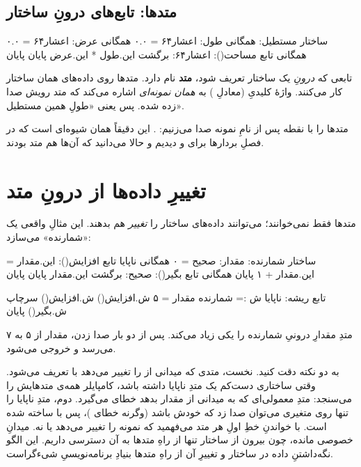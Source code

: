 \subsection{متدها: تابع‌های درونِ ساختار}

\begin{salamfa}
ساختار مستطیل:
    همگانی طول: اعشار۶۴ = ۰.۰
    همگانی عرض: اعشار۶۴ = ۰.۰
    همگانی تابع مساحت(): اعشار۶۴:
        برگشت این.طول * این.عرض
    پایان
پایان
\end{salamfa}

تابعی که \emph{درونِ} یک ساختار تعریف شود، \textbf{متد} نام دارد. متدها روی
داده‌های همان ساختار کار می‌کنند. واژهٔ کلیدیِ  (معادلِ )
به \emph{همان نمونه‌ای} اشاره می‌کند که متد رویش صدا زده شده. پس
 یعنی «طولِ همین مستطیل».

متدها را با نقطه پس از نامِ نمونه صدا می‌زنیم: . این دقیقاً
همان شیوه‌ای است که در فصلِ بردارها برای  و 
دیدیم و حالا می‌دانید که آن‌ها هم متد بودند.

\section{تغییرِ داده‌ها از درونِ متد}

متدها فقط نمی‌خوانند؛ می‌توانند داده‌های ساختار را \emph{تغییر} هم بدهند. این
مثالِ واقعی یک «شمارنده» می‌سازد:

\begin{salamfa}
ساختار شمارنده:
    مقدار: صحیح = ۰
    همگانی ناپایا تابع افزایش():
        این.مقدار = این.مقدار + ۱
    پایان
    همگانی تابع بگیر(): صحیح:
        برگشت این.مقدار
    پایان
پایان

تابع ریشه:
    ناپایا ش := شمارنده { مقدار = ۵ }
    ش.افزایش()
    ش.افزایش()
    سرچاپ ش.بگیر()
پایان
\end{salamfa}

متدِ  مقدارِ درونیِ شمارنده را یکی زیاد می‌کند. پس از دو بار صدا
زدن، مقدار از ۵ به ۷ می‌رسد و خروجی  می‌شود.

به دو نکته دقت کنید. نخست، متدی که میدانی از  را تغییر می‌دهد با
 تعریف می‌شود. وقتی ساختاری دست‌کم یک متدِ ناپایا داشته باشد،
کامپایلر همه‌ی متدهایش را می‌سنجد: متدِ معمولی‌ای که به میدانی از  مقدار
بدهد خطای  می‌گیرد. دوم، متدِ ناپایا را تنها روی متغیری می‌توان صدا
زد که خودش  باشد (وگرنه خطای )، پس  با
 ساخته شده است.
با خواندنِ خطِ اولِ هر متد می‌فهمید که نمونه را تغییر می‌دهد یا نه. میدانِ
 خصوصی مانده، چون بیرون از ساختار تنها از راهِ متدها به آن دسترسی
داریم. این الگو نگه‌داشتنِ
داده در ساختار و تغییرِ آن از راهِ متدها بنیادِ برنامه‌نویسیِ شیءگراست.


